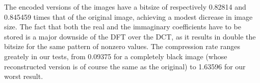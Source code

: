 The encoded versions of the images have a bitsize of respectively 0.82814 and 0.845459 times that of the original image, achieving a modest dicrease in image size. The fact that both the real and the immaginary coefficients have to be stored is a major downside of the DFT over the DCT, as it results in double the bitsize for the same pattern of nonzero values. The compression rate ranges greately in our tests, from 0.09375 for a completely black image (whose reconstructed version is of course the same as the original) to 1.63596 for our worst result.